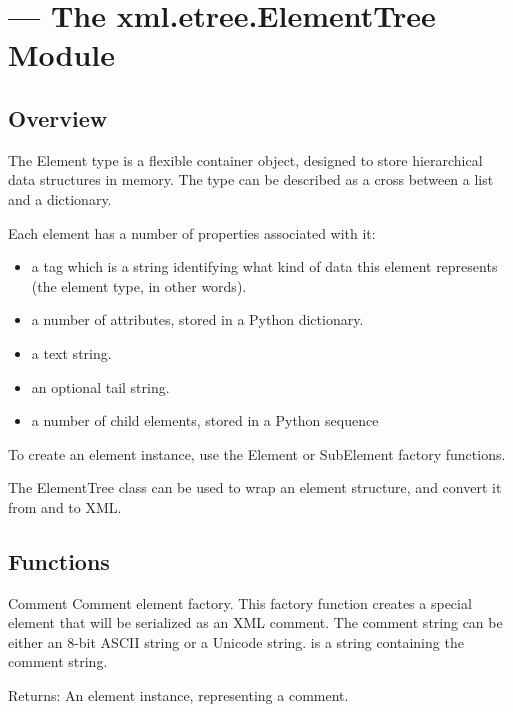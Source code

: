 \section{ --- The xml.etree.ElementTree Module}


\subsection{Overview\label{elementtree-overview}}

The Element type is a flexible container object, designed to store
hierarchical data structures in memory. The type can be described as a
cross between a list and a dictionary.

Each element has a number of properties associated with it:
\begin{itemize}
\item {} 
a tag which is a string identifying what kind of data
this element represents (the element type, in other words).

\item {} 
a number of attributes, stored in a Python dictionary.

\item {} 
a text string.

\item {} 
an optional tail string.

\item {} 
a number of child elements, stored in a Python sequence

\end{itemize}

To create an element instance, use the Element or SubElement factory
functions.

The ElementTree class can be used to wrap an element
structure, and convert it from and to XML.


\subsection{Functions\label{elementtree-functions}}

\begin{funcdesc}{Comment}{}
Comment element factory.  This factory function creates a special
element that will be serialized as an XML comment.
The comment string can be either an 8-bit ASCII string or a Unicode
string.
 is a string containing the comment string.

\begin{datadescni}{Returns:}
An element instance, representing a comment.
\end{datadescni}
\end{funcdesc}

